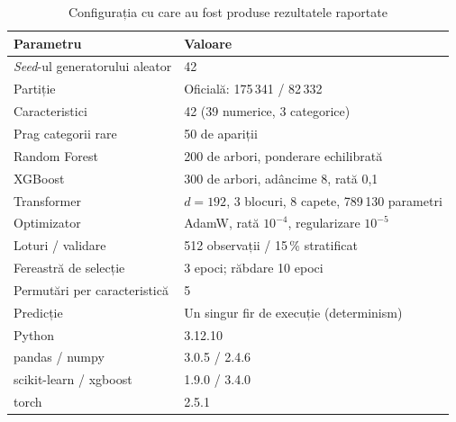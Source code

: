 \begin{table}[!ht]
    \caption{Configurația cu care au fost produse rezultatele raportate}
    \centering\footnotesize
    \begin{tabular}{|l|l|}
        \hline
        \textbf{Parametru} & \textbf{Valoare} \\
        \hline
        \textit{Seed}-ul generatorului aleator & 42 \\
        \hline
        Partiție & Oficială: 175\,341 / 82\,332 \\
        \hline
        Caracteristici & 42 (39 numerice, 3 categorice) \\
        \hline
        Prag categorii rare & 50 de apariții \\
        \hline
        Random Forest & 200 de arbori, ponderare echilibrată \\
        \hline
        XGBoost & 300 de arbori, adâncime 8, rată 0,1 \\
        \hline
        Transformer & $d = 192$, 3 blocuri, 8 capete, 789\,130 parametri \\
        \hline
        Optimizator & AdamW, rată $10^{-4}$, regularizare $10^{-5}$ \\
        \hline
        Loturi / validare & 512 observații / 15\,\% stratificat \\
        \hline
        Fereastră de selecție & 3 epoci; răbdare 10 epoci \\
        \hline
        Permutări per caracteristică & 5 \\
        \hline
        Predicție & Un singur fir de execuție (determinism) \\
        \hline
        Python & 3.12.10 \\
        \hline
        pandas / numpy & 3.0.5 / 2.4.6 \\
        \hline
        scikit-learn / xgboost & 1.9.0 / 3.4.0 \\
        \hline
        torch & 2.5.1 \\
        \hline
    \end{tabular}
    \label{tab:anexa-config}
\end{table}
